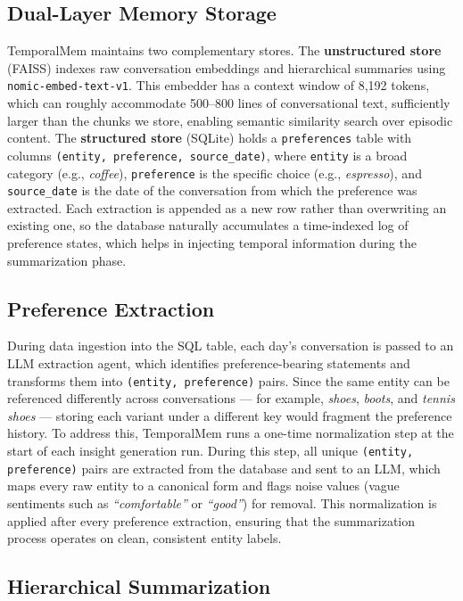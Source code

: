 \documentclass{article}
\begin{document}
\subsection{Dual-Layer Memory Storage}

TemporalMem maintains two complementary stores. The \textbf{unstructured store} (FAISS) indexes raw conversation embeddings and hierarchical summaries using \texttt{nomic-embed-text-v1}. This embedder has a context window of 8,192 tokens, which can roughly accommodate 500--800 lines of conversational text, sufficiently larger than the chunks we store, enabling semantic similarity search over episodic content. The \textbf{structured store} (SQLite) holds a \texttt{preferences} table with columns \texttt{(entity, preference, source\_date)}, where \texttt{entity} is a broad category (e.g., \textit{coffee}), \texttt{preference} is the specific choice (e.g., \textit{espresso}), and \texttt{source\_date} is the date of the conversation from which the preference was extracted. Each extraction is appended as a new row rather than overwriting an existing one, so the database naturally accumulates a time-indexed log of preference states, which helps in injecting temporal information during the summarization phase.


\subsection{Preference Extraction}

During data ingestion into the SQL table, each day's conversation is passed to an LLM extraction agent, which identifies preference-bearing statements and transforms them into \texttt{(entity, preference)} pairs. Since the same entity can be referenced differently across conversations — for example, \textit{shoes}, \textit{boots}, and \textit{tennis shoes} — storing each variant under a different key would fragment the preference history. To address this, TemporalMem runs a one-time normalization step at the start of each insight generation run. During this step, all unique \texttt{(entity, preference)} pairs are extracted from the database and sent to an LLM, which maps every raw entity to a canonical form and flags noise values (vague sentiments such as \textit{``comfortable''} or \textit{``good''}) for removal. This normalization is applied after every preference extraction, ensuring that the summarization process operates on clean, consistent entity labels.


\subsection{Hierarchical Summarization}
\end{document}

